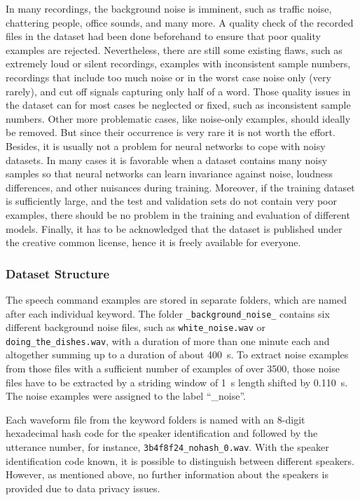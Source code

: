 In many recordings, the background noise is imminent, such as traffic noise, chattering people, office sounds, and many more.
A quality check of the recorded files in the dataset had been done beforehand to ensure that poor quality examples are rejected.
Nevertheless, there are still some existing flaws, such as extremely loud or silent recordings, examples with inconsistent sample numbers, recordings that include too much noise or in the worst case noise only (very rarely), and cut off signals capturing only half of a word.
Those quality issues in the dataset can for most cases be neglected or fixed, such as inconsistent sample numbers. 
Other more problematic cases, like noise-only examples, should ideally be removed.
But since their occurrence is very rare it is not worth the effort.
Besides, it is usually not a problem for neural networks to cope with noisy datasets.
In many cases it is favorable when a dataset contains many noisy samples so that neural networks can learn invariance against noise, loudness differences, and other nuisances during training.
Moreover, if the training dataset is sufficiently large, and the test and validation sets do not contain very poor examples, there should be no problem in the training and evaluation of different models.
Finally, it has to be acknowledged that the dataset is published under the creative common license, hence it is freely available for everyone.



\subsubsection{Dataset Structure}\label{sec:exp_dataset_structure}
The speech command examples are stored in separate folders, which are named after each individual keyword.
The folder \texttt{\_background\_noise\_} contains six different background noise files, such as \texttt{white\_noise.wav} or \texttt{doing\_the\_dishes.wav}, with a duration of more than one minute each and altogether summing up to a duration of about \SI{400}{s}.
To extract noise examples from those files with a sufficient number of examples of over 3500, those noise files have to be extracted by a striding window of \SI{1}{\second} length shifted by \SI{0.110}{\second}.
The noise examples were assigned to the label \enquote{\_noise}.

Each waveform file from the keyword folders is named with an 8-digit hexadecimal hash code for the speaker identification and followed by the utterance number, for instance, \texttt{3b4f8f24\_nohash\_0.wav}.
With the speaker identification code known, it is possible to distinguish between different speakers.
However, as mentioned above, no further information about the speakers is provided due to data privacy issues.

